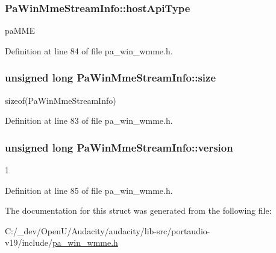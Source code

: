 \subsubsection[{\texorpdfstring{host\+Api\+Type}{hostApiType}}]{ Pa\+Win\+Mme\+Stream\+Info\+::host\+Api\+Type}\hypertarget{struct_pa_win_mme_stream_info_a393237910fb36b3f42396a365184ce01}{}\label{struct_pa_win_mme_stream_info_a393237910fb36b3f42396a365184ce01}
pa\+M\+ME 

Definition at line 84 of file pa\+\_\+win\+\_\+wmme.\+h.

\subsubsection[{\texorpdfstring{size}{size}}]{\setlength{\rightskip}{0pt plus 5cm}unsigned long Pa\+Win\+Mme\+Stream\+Info\+::size}\hypertarget{struct_pa_win_mme_stream_info_a62c0f8888229904962efdbec924d2527}{}\label{struct_pa_win_mme_stream_info_a62c0f8888229904962efdbec924d2527}
sizeof(\+Pa\+Win\+Mme\+Stream\+Info) 

Definition at line 83 of file pa\+\_\+win\+\_\+wmme.\+h.

\subsubsection[{\texorpdfstring{version}{version}}]{\setlength{\rightskip}{0pt plus 5cm}unsigned long Pa\+Win\+Mme\+Stream\+Info\+::version}\hypertarget{struct_pa_win_mme_stream_info_a881694ff44db0af4d0f3067453c3db38}{}\label{struct_pa_win_mme_stream_info_a881694ff44db0af4d0f3067453c3db38}
1 

Definition at line 85 of file pa\+\_\+win\+\_\+wmme.\+h.



The documentation for this struct was generated from the following file\+:\begin{DoxyCompactItemize}
\item 
C\+:/\+\_\+dev/\+Open\+U/\+Audacity/audacity/lib-\/src/portaudio-\/v19/include/\hyperlink{pa__win__wmme_8h}{pa\+\_\+win\+\_\+wmme.\+h}\end{DoxyCompactItemize}
